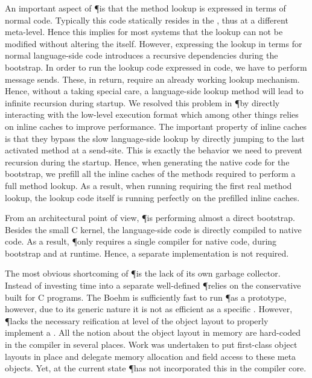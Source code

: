 An important aspect of \P is that the method lookup is expressed in terms of normal \ST code.
Typically this code statically resides in the \VM, thus at a different meta-level.
Hence this implies for most systems that the lookup can not be modified without altering the \VM itself.
However, expressing the lookup in terms for normal language-side code introduces a recursive dependencies during the bootstrap.
In order to run the lookup code expressed in \ST code, we have to perform message sends.
These, in return, require an already working lookup mechanism.
Hence, without a taking special care, a language-side lookup method will lead to infinite recursion during startup.
We resolved this problem in \P by directly interacting with the low-level execution format which among other things relies on inline caches to improve performance.
The important property of inline caches is that they bypass the slow language-side lookup by directly jumping to the last activated method at a send-site.
This is exactly the behavior we need to prevent recursion during the startup.
Hence, when generating the native code for the bootstrap, we prefill all the inline caches of the methods required to perform a full method lookup.
As a result, when running requiring the first real method lookup, the lookup code itself is running perfectly on the prefilled inline caches.

From an architectural point of view, \P is performing almost a direct bootstrap.
Besides the small C kernel, the language-side code is directly compiled to native code.
As a result, \P only requires a single compiler for native code, during bootstrap and at runtime.
Hence, a separate \JIT implementation is not required.

The most obvious shortcoming of \P is the lack of its own garbage collector.
Instead of investing time into a separate well-defined \GC \P relies on the conservative  built for C programs.
The Boehm \GC is sufficiently fast to run \P as a prototype, however, due to its generic nature it is not as efficient as a specific \GC.
However, \P lacks the necessary reification at level of the object layout to properly implement a \GC.
All the notion about the object layout in memory are hard-coded in the compiler in several places.
Work was undertaken to put first-class object layouts in place and delegate memory allocation and field access to these meta objects.
Yet, at the current state \P has not incorporated this in the compiler core.

